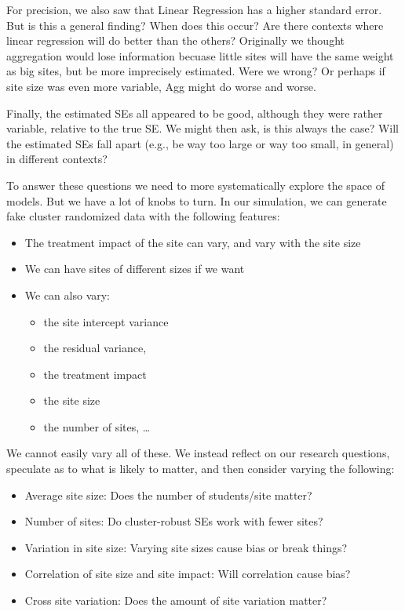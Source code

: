 \documentclass[
]{book}
\providecommand{\tightlist}{%
  \setlength{\itemsep}{0pt}\setlength{\parskip}{0pt}}
\begin{document}
For precision, we also saw that Linear Regression has a higher standard error.
But is this a general finding? When does this occur?
Are there contexts where linear regression will do better than the others?
Originally we thought aggregation would lose information becuase little sites will have the same weight as big sites, but be more imprecisely estimated.
Were we wrong? Or perhaps if site size was even more variable, Agg might do worse and worse.

Finally, the estimated SEs all appeared to be good, although they were rather variable, relative to the true SE.
We might then ask, is this always the case? Will the estimated SEs fall apart (e.g., be way too large or way too small, in general) in different contexts?

To answer these questions we need to more systematically explore the space of models. But we have a lot of knobs to turn.
In our simulation, we can generate fake cluster randomized data with the following features:

\begin{itemize}
\item
  The treatment impact of the site can vary, and vary with the site size
\item
  We can have sites of different sizes if we want
\item
  We can also vary:

  \begin{itemize}
  \tightlist
  \item
    the site intercept variance
  \item
    the residual variance,
  \item
    the treatment impact
  \item
    the site size
  \item
    the number of sites, \ldots{}
  \end{itemize}
\end{itemize}

We cannot easily vary all of these.
We instead reflect on our research questions, speculate as to what is likely to matter, and then consider varying the following:

\begin{itemize}
\tightlist
\item
  Average site size: Does the number of students/site matter?
\item
  Number of sites: Do cluster-robust SEs work with fewer sites?
\item
  Variation in site size: Varying site sizes cause bias or break things?
\item
  Correlation of site size and site impact: Will correlation cause bias?
\item
  Cross site variation: Does the amount of site variation matter?
\end{itemize}
\end{document}
